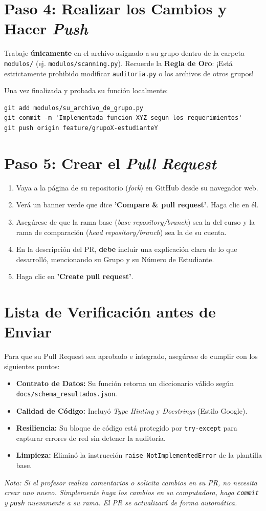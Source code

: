 \documentclass[12pt,a4paper]{article}
\begin{document}
\section{Paso 4: Realizar los Cambios y Hacer \textit{Push}}
Trabaje \textbf{únicamente} en el archivo asignado a su grupo dentro de la carpeta \texttt{modulos/} (ej. \texttt{modulos/scanning.py}). Recuerde la \textbf{Regla de Oro}: ¡Está estrictamente prohibido modificar \texttt{auditoria.py} o los archivos de otros grupos!

Una vez finalizada y probada su función localmente:
\begin{verbatim}
git add modulos/su_archivo_de_grupo.py
git commit -m 'Implementada funcion XYZ segun los requerimientos'
git push origin feature/grupoX-estudianteY
\end{verbatim}

\section{Paso 5: Crear el \textit{Pull Request}}
\begin{enumerate}
    \item Vaya a la página de su repositorio (\textit{fork}) en GitHub desde su navegador web.
    \item Verá un banner verde que dice \textbf{'Compare \& pull request'}. Haga clic en él.
    \item Asegúrese de que la rama base (\textit{base repository/branch}) sea la del curso y la rama de comparación (\textit{head repository/branch}) sea la de su cuenta.
    \item En la descripción del PR, \textbf{debe} incluir una explicación clara de lo que desarrolló, mencionando su Grupo y su Número de Estudiante.
    \item Haga clic en \textbf{'Create pull request'}.
\end{enumerate}

\section*{Lista de Verificación antes de Enviar}
Para que su Pull Request sea aprobado e integrado, asegúrese de cumplir con los siguientes puntos:
\begin{itemize}
    \item[\checkmark] \textbf{Contrato de Datos:} Su función retorna un diccionario válido según \texttt{docs/schema\_resultados.json}.
    \item[\checkmark] \textbf{Calidad de Código:} Incluyó \textit{Type Hinting} y \textit{Docstrings} (Estilo Google).
    \item[\checkmark] \textbf{Resiliencia:} Su bloque de código está protegido por \texttt{try-except} para capturar errores de red sin detener la auditoría.
    \item[\checkmark] \textbf{Limpieza:} Eliminó la instrucción \texttt{raise NotImplementedError} de la plantilla base.
\end{itemize}

\vspace{0.5cm}
\noindent \textit{Nota: Si el profesor realiza comentarios o solicita cambios en su PR, no necesita crear uno nuevo. Simplemente haga los cambios en su computadora, haga \texttt{commit} y \texttt{push} nuevamente a su rama. El PR se actualizará de forma automática.}
\end{document}
